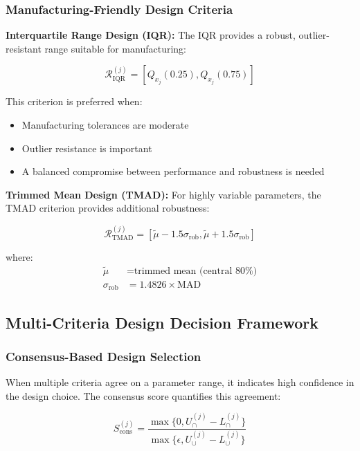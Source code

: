 \documentclass[12pt,a4paper]{article}
\begin{document}
\subsubsection{Manufacturing-Friendly Design Criteria}

\textbf{Interquartile Range Design (IQR):}
The IQR provides a robust, outlier-resistant range suitable for manufacturing:

\begin{equation}
\mathcal{R}_{\text{IQR}}^{(j)} = [Q_{x_j}(0.25), Q_{x_j}(0.75)]
\end{equation}

This criterion is preferred when:
\begin{itemize}
    \item Manufacturing tolerances are moderate
    \item Outlier resistance is important
    \item A balanced compromise between performance and robustness is needed
\end{itemize}

\textbf{Trimmed Mean Design (TMAD):}
For highly variable parameters, the TMAD criterion provides additional robustness:

\begin{equation}
\mathcal{R}_{\text{TMAD}}^{(j)} = [\tilde{\mu} - 1.5\sigma_{\text{rob}}, \tilde{\mu} + 1.5\sigma_{\text{rob}}]
\end{equation}

where:
\begin{align}
\tilde{\mu} &= \text{trimmed mean (central 80\%)} \\
\sigma_{\text{rob}} &= 1.4826 \times \text{MAD}
\end{align}

\subsection{Multi-Criteria Design Decision Framework}

\subsubsection{Consensus-Based Design Selection}

When multiple criteria agree on a parameter range, it indicates high confidence in the design choice. The consensus score quantifies this agreement:

\begin{equation}
S_{\text{cons}}^{(j)} = \frac{\max\{0, U_{\cap}^{(j)} - L_{\cap}^{(j)}\}}{\max\{\epsilon, U_{\cup}^{(j)} - L_{\cup}^{(j)}\}}
\end{equation}
\end{document}
